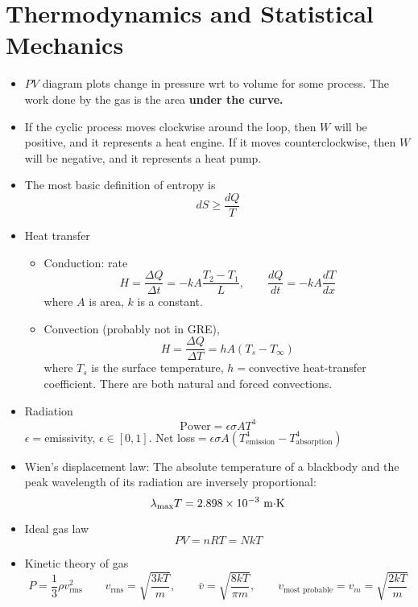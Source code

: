 

















\chapter{Thermodynamics and Statistical Mechanics}
\begin{itemize}
\item $PV$ diagram plots change in pressure wrt to volume for some process.
The work done by the gas is the area \textbf{under the curve.}
\item If the cyclic process moves clockwise around the loop, then $W$ will
be positive, and it represents a heat engine. If it moves counterclockwise,
then $W$ will be negative, and it represents a heat pump.
\item The most basic definition of entropy is \[
dS\geq\frac{dQ}{T}\]

\item Heat transfer

\begin{itemize}
\item Conduction: rate\[
H=\frac{\Delta Q}{\Delta t}=-kA\frac{T_{2}-T_{1}}{L},\qquad\frac{dQ}{dt}=-kA\frac{dT}{dx}\]
where $A$ is area, $k$ is a constant.
\item Convection (probably not in GRE),\[
H=\frac{\Delta Q}{\Delta T}=hA(T_{s}-T_{\infty})\]
where $T_{s}$ is the surface temperature, $h=$convective heat-transfer
coefficient. There are both natural and forced convections.
\end{itemize}
\item Radiation\[
\text{Power}=\epsilon\sigma AT^{4}\]
$\epsilon=$emissivity, $\epsilon\in[0,1]$. Net loss$=\epsilon\sigma A(T_{\text{emission}}^{4}-T_{\text{absorption}}^{4})$
\item Wien's displacement law: The absolute temperature of a blackbody and
the peak wavelength of its radiation are inversely proportional:\[
\lambda_{\text{max}}T=2.898\times10^{-3}\ \text{m\ensuremath{\cdot}K}\]

\item Ideal gas law\[
PV=nRT=NkT\]

\item Kinetic theory of gas\[
P=\frac{1}{3}\rho v_{\text{rms}}^{2}\qquad v_{\text{rms}}=\sqrt{\frac{3kT}{m}},\qquad\bar{v}=\sqrt{\frac{8kT}{\pi m}},\qquad v_{\text{most probable}}=v_{m}=\sqrt{\frac{2kT}{m}}\]


\end{itemize}
